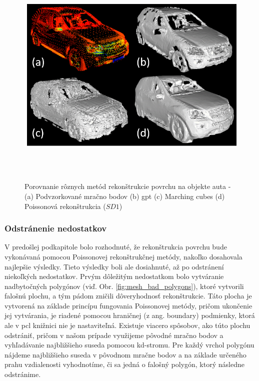 \begin{figure}[!htbp]
  \centering
  \includegraphics[width=16cm, height=11cm]{img/mesh_methods_compararison.png}
  \caption{Porovnanie rôznych metód rekonštrukcie povrchu na objekte auta - (a) Podvzorkované mračno bodov (b) \acrshort{gpt} (c) Marching cubes (d) Poissonová rekonštrukcia ($SD1$)} 
  \label{fig:mesh_compararison}
\end{figure} 

\subsubsection{Odstránenie nedostatkov}
\noindent V predošlej podkapitole bolo rozhodnuté, že rekonštrukcia povrchu bude vykonávaná pomocou Poissonovej rekonštrukčnej metódy, nakoľko dosahovala najlepšie výsledky. Tieto výsledky boli ale dosiahnuté, až po odstránení niekoľkých nedostatkov. 
\newline\indent Prvým dôležitým nedostatkom bolo vytváranie nadbytočných polygónov (viď. Obr. \ref{fig:mesh_bad_polygons}), ktoré vytvorili falošnú plochu, a tým pádom zničili dôveryhodnosť rekonštrukcie. Táto plocha je vytvorená na základe princípu fungovania Poissonovej metódy, pričom ukončenie jej vytvárania, je riadené pomocou hraničnej (z ang. boundary) podmienky, ktorá ale v \acrshort{pcl} knižnici nie je nastaviteľná. Existuje viacero spôsobov, ako túto plochu odstrániť, pričom v našom prípade využijeme pôvodné mračno bodov a vyhľadávanie najbližšieho suseda pomocou kd-stromu. Pre každý vrchol polygónu nájdeme najbližšieho suseda v pôvodnom mračne bodov a na základe určeného prahu vzdialenosti vyhodnotíme, či sa jedná o falošný polygón, ktorý následne odstránime.

